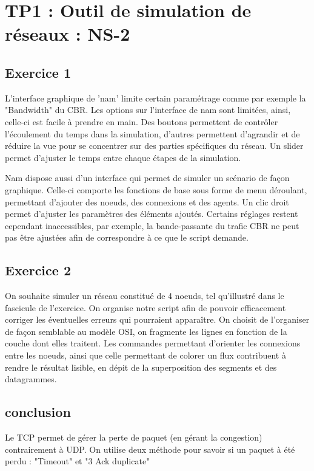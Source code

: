 \chapter{TP1 : Outil de simulation de réseaux : NS-2}
    \section{Exercice 1}
        L'interface graphique de 'nam' limite certain paramétrage comme par exemple la "Bandwidth" du CBR.
        Les options sur l'interface de nam sont limitées, ainsi, celle-ci est facile à prendre en main. Des boutons permettent de contrôler l'écoulement du temps dans la simulation, d'autres permettent d'agrandir et de réduire la vue pour se concentrer sur des parties spécifiques du réseau. Un slider permet d'ajuster le temps entre chaque étapes de la simulation.

        Nam dispose aussi d'un interface qui permet de simuler un scénario de façon graphique. Celle-ci comporte les fonctions de base sous forme de menu déroulant, permettant d'ajouter des noeuds, des connexions et des agents. Un clic droit permet d'ajuster les paramètres des éléments ajoutés.
        Certains réglages restent cependant inaccessibles, par exemple, la bande-passante du trafic CBR ne peut pas être ajustées afin de correspondre à ce que le script demande.
    \section{Exercice 2}
        On souhaite simuler un réseau constitué de 4 noeuds, tel qu'illustré dans le fascicule de l'exercice. On organise notre script afin de pouvoir efficacement corriger les éventuelles erreurs qui pourraient apparaître. On choisit de l'organiser de façon semblable au modèle OSI, on fragmente les lignes en fonction de la couche dont elles traitent.
        Les commandes permettant d'orienter les connexions entre les noeuds, ainsi que celle permettant de colorer un flux contribuent à rendre le résultat lisible, en dépit de la superposition des segments et des datagrammes.

    \section{conclusion}
        Le TCP permet de gérer la perte de paquet (en gérant la congestion) contrairement à UDP.
        On utilise deux méthode pour savoir si un paquet à été perdu : "Timeout" et "3 Ack duplicate"
